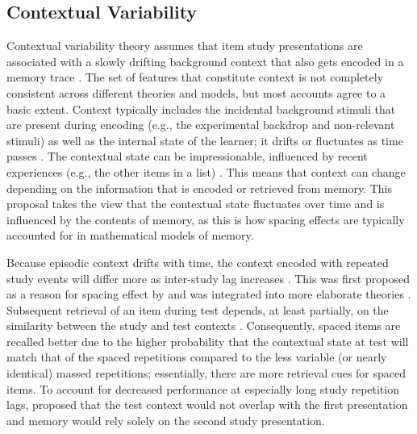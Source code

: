 
\subsection{Contextual Variability}

Contextual variability theory assumes that item study presentations are associated with a slowly drifting background context that also gets encoded in a memory trace \cite{Bowe1972,Este1955a,Melt1970}.
The set of features that constitute context is not completely consistent across different theories and models, but most accounts agree to a basic extent.  Context typically includes the incidental background stimuli that are present during encoding (e.g., the experimental backdrop and non-relevant stimuli) as well as the internal state of the learner; it drifts or fluctuates as time passes \cite{Bowe1972,DelaEtal2010,Glen1979,MalmShif2005,Raai2003}.  The contextual state can be impressionable, influenced by recent experiences (e.g., the other items in a list) \cite{HowaKaha2002,SedeEtal2008}. This means that context can change depending on the information that is encoded or retrieved from memory.  This proposal takes the view that the contextual state fluctuates over time and is influenced by the contents of memory, as this is how spacing effects are typically accounted for in mathematical models of memory.


Because episodic context drifts with time, the context encoded with repeated study events will differ more as inter-study lag increases \cite{Este1955a}.  This was first proposed as a reason for spacing effect by  and was integrated into more elaborate theories \cite{Bowe1972,Glen1976,Glen1979}.  Subsequent retrieval of an item during test depends, at least partially, on the similarity between the study and test contexts \cite<in line with the encoding specificity principle>{TulvThom1973}.  Consequently, spaced items are recalled better due to the higher probability that the contextual state at test will match that of the spaced repetitions compared to the less variable (or nearly identical) massed repetitions; essentially, there are more retrieval cues for spaced items.  To account for decreased performance at especially long study repetition lags,  proposed that the test context would not overlap with the first presentation and memory would rely solely on the second study presentation.


